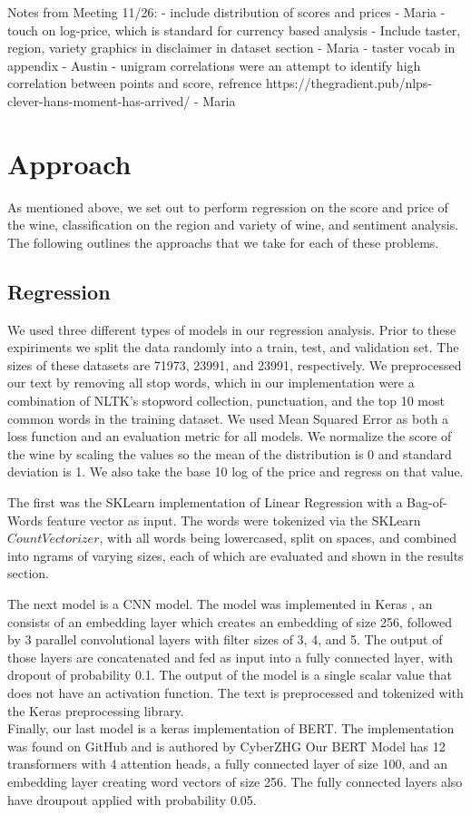 \documentclass[10pt]{IEEEtran}
\begin{document}
    Notes from Meeting 11/26:
    - include distribution of scores and prices - Maria
        - touch on log-price, which is standard for currency based analysis
    - Include taster, region, variety graphics in disclaimer in dataset section - Maria
    - taster vocab in appendix - Austin
    - unigram correlations were an attempt to identify high correlation between points and score, refrence https://thegradient.pub/nlps-clever-hans-moment-has-arrived/ - Maria

\section{Approach}
    As mentioned above, we set out to perform regression on the score and price of the wine, classification on the region and variety of wine, and sentiment analysis. The following outlines the approachs that we take for each of these problems.

\subsection{Regression}
    We used three different types of models in our regression analysis. Prior to these expiriments we split the data randomly into a train, test, and validation set. The sizes of these datasets are 71973, 23991, and 23991, respectively. We preprocessed our text by removing all stop words, which in our implementation were a combination of NLTK's stopword collection, punctuation, and the top 10 most common words in the training dataset. We used Mean Squared Error as both a loss function and an evaluation metric for all models. We normalize the score of the wine by scaling the values so the mean of the distribution is 0 and standard deviation is 1. We also take the base 10 log of the price and regress on that value. \par
    The first was the SKLearn implementation of Linear Regression with a Bag-of-Words feature vector as input. The words were tokenized via the SKLearn $CountVectorizer$, with all words being lowercased, split on spaces, and combined into ngrams of varying sizes, each of which are evaluated and shown in the results section. \par
    The next model is a CNN model. The model was implemented in Keras \cite{keras}, an consists of an embedding layer which creates an embedding of size 256, followed by 3 parallel convolutional layers with filter sizes of 3, 4, and 5. The output of those layers are concatenated and fed as input into a fully connected layer, with dropout of probability 0.1. The output of the model is a single scalar value that does not have an activation function. The text is preprocessed and tokenized with the Keras preprocessing library. \\
    Finally, our last model is a keras \cite{keras} implementation of BERT. The implementation was found on GitHub and is authored by CyberZHG \cite{keras_bert} Our BERT Model has 12 transformers with 4 attention heads, a fully connected layer of size 100, and an embedding layer creating word vectors of size 256. The fully connected layers also have droupout applied with probability 0.05.
\end{document}
